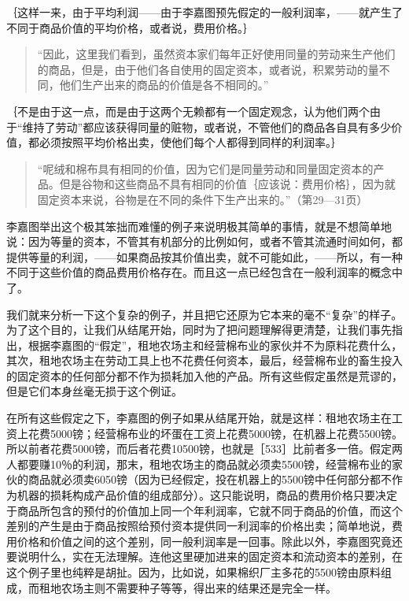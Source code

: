 ｛这样一来，由于平均利润——由于李嘉图预先假定的一般利润率，——就产生了不同于商品价值的平均价格，或者说，费用价格。｝

\begin{quote}{“因此，这里我们看到，虽然资本家们每年正好使用同量的劳动来生产他们的商品，但是，由于他们各自使用的固定资本，或者说，积累劳动的量不同，他们生产出来的商品的价值是各不相同的。”}\end{quote}

｛不是由于这一点，而是由于这两个无赖都有一个固定观念，认为他们两个由于“维持了劳动”都应该获得同量的赃物，或者说，不管他们的商品各自具有多少价值，都必须按照平均价格出卖，使他们每个人都得到同样的利润率。｝

\begin{quote}{“呢绒和棉布具有相同的价值，因为它们是同量劳动和同量固定资本的产品。但是谷物和这些商品不具有相同的价值｛应该说：费用价格｝，因为就固定资本来说，谷物是在不同的条件下生产出来的。”（第29—31页）}\end{quote}

李嘉图举出这个极其笨拙而难懂的例子来说明极其简单的事情，就是不想简单地说：因为等量的资本，不管其有机部分的比例如何，或者不管其流通时间如何，都提供等量的利润，——如果商品按其价值出卖，就不可能如此，——所以，有一种不同于这些价值的商品费用价格存在。而且这一点已经包含在一般利润率的概念中了。

我们就来分析一下这个复杂的例子，并且把它还原为它本来的毫不“复杂”的样子。为了这个目的，让我们从结尾开始，同时为了把问题理解得更清楚，让我们事先指出，根据李嘉图的“假定”，租地农场主和经营棉布业的家伙并不为原料花费什么，其次，租地农场主在劳动工具上也不花费任何资本，最后，经营棉布业的畜生投入的固定资本的任何部分都不作为损耗加入他的产品。所有这些假定虽然是荒谬的，但是它们本身丝毫无损于这个例证。

在所有这些假定之下，李嘉图的例子如果从结尾开始，就是这样：租地农场主在工资上花费5000镑；经营棉布业的坏蛋在工资上花费5000镑，在机器上花费5500镑。所以前者花费5000镑，而后者花费10500镑，也就是［533］比前者多一倍。假定两人都要赚10％的利润，那末，租地农场主的商品就必须卖5500镑，经营棉布业的家伙的商品就必须卖6050镑（因为已经假定，投在机器上的5500镑中任何部分都不作为机器的损耗构成产品价值的组成部分）。这只能说明，商品的费用价格只要决定于商品所包含的预付的价值加上同一个年利润率，它就不同于商品的价值，而这个差别的产生是由于商品按照给预付资本提供同一利润率的价格出卖；简单地说，费用价格和价值之间的这个差别，同一般利润率是一回事。除此以外，李嘉图究竟还要说明什么，实在无法理解。连他这里硬加进来的固定资本和流动资本的差别，在这个例子里也纯粹是胡扯。因为，比如说，如果棉织厂主多花的5500镑由原料组成，而租地农场主则不需要种子等等，得出来的结果还是完全一样。

